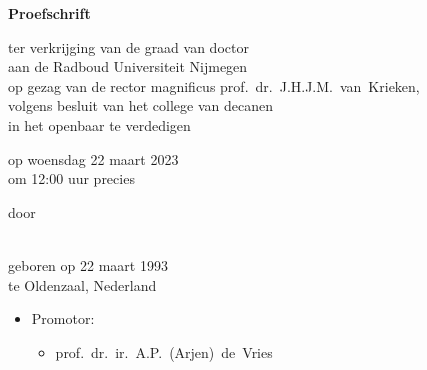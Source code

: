 \begin{titlepage}
	\begin{center}
		\vspace*{3.5cm}
		
		\huge{\bfseries\mytitle}
		
		\vspace*{15pt}
		
		
		\vspace*{5pt}
		
		\normalsize
		
		\vspace{2.0cm}
		
		\textbf{Proefschrift}
		
		\vspace{0.5cm}
		
		ter verkrijging van de graad van doctor\\
		aan de Radboud Universiteit Nijmegen\\
		op gezag van de rector magnificus prof.~dr.~J.H.J.M.\ van\ Krieken,\\
		volgens besluit van het college van decanen\\
		in het openbaar te verdedigen
		
		\vspace{0.5cm}
		
		op woensdag 22 maart 2023\\
		\vspace{0.2cm}
		om 12:00 uur precies
		
		\vspace{0.5cm}
		
		door
		
		\vspace{0.5cm}
		
		\textbf{\myauthor}\\
		
		geboren op 22 maart 1993\\
		te Oldenzaal, Nederland
	\end{center}
\end{titlepage}

\newpage%

\thispagestyle{empty}

\begin{itemize}
	\item[] Promotor:
	\begin{itemize}
		\item[] prof.\ dr.\ ir.\ A.P.\ (Arjen)\ de\ Vries
	\end{itemize}
\end{itemize}

